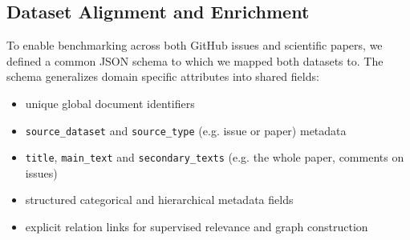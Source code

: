 \documentclass[11pt]{article}
\begin{document}
\subsection{Dataset Alignment and Enrichment}
\label{subsec:data_align_enrich}
To enable benchmarking across both GitHub issues and scientific papers, we defined a common JSON schema to which we mapped both datasets to. The schema generalizes domain specific attributes into shared fields:
\begin{itemize}
    \setlength{\itemsep}{2pt}
    \setlength{\parskip}{0pt}
    \setlength{\topsep}{4pt}
    \item unique global document identifiers
    \item \texttt{source\_dataset} and \texttt{source\_type} (e.g. issue or paper) metadata
    \item \texttt{title}, \texttt{main\_text} and \texttt{secondary\_texts} (e.g. the whole paper, comments on issues)
    \item structured categorical and hierarchical metadata fields
    \item explicit relation links for supervised relevance and graph construction
    \end{itemize}
\end{document}
